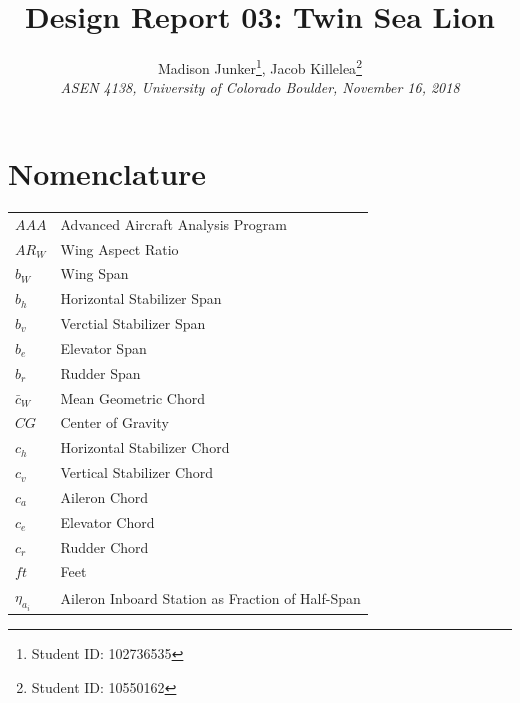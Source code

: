 \documentclass[conf]{new-aiaa}
\title{Design Report 03: Twin Sea Lion}
\author{
    Madison Junker\footnote{Student ID: 102736535 }, Jacob Killelea\footnote{Student ID: 10550162 } \\
    \emph{ASEN 4138, University of Colorado Boulder, November 16, 2018}
}
\begin{document}
\clearpage
\maketitle
\thispagestyle{empty}

\newpage
{}
\tableofcontents
{}
\listoffigures
{}
\listoftables
\newpage
\printnomenclature[25mm]

\section*{Nomenclature}

{\renewcommand\arraystretch{1.0}
\noindent\begin{longtable*}{@{}l @{\quad=\quad} l@{}}
$AAA$     	               & Advanced Aircraft Analysis Program \\
$AR_W$    	               & Wing Aspect Ratio          \\
$b_W$	  	               & Wing Span                  \\
$b_h$	  	               & Horizontal Stabilizer Span \\
$b_v$	  	               & Verctial Stabilizer Span   \\
$b_e$	  	               & Elevator Span   \\
$b_r$	  	               & Rudder Span   \\
$\bar{c}_W$	  	           & Mean Geometric Chord               \\
$CG$	  	               & Center of Gravity \\
$c_h$	  	               & Horizontal Stabilizer Chord \\
$c_v$	  	               & Vertical Stabilizer Chord \\
$c_a$	  	               & Aileron Chord \\
$c_e$	  	               & Elevator Chord \\
$c_r$	  	               & Rudder Chord \\
$ft$	  	               & Feet \\
$\eta_{a_i}$               & Aileron Inboard Station as Fraction of Half-Span \\

\end{longtable*}}
\end{document}
